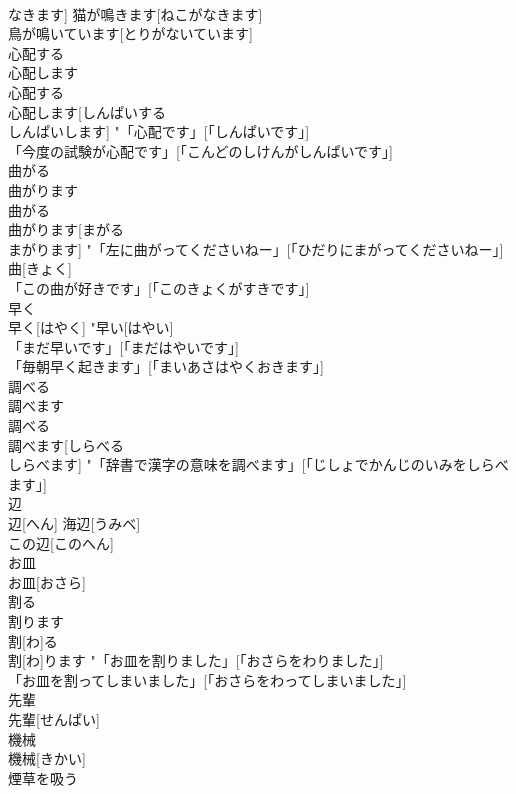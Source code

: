 \documentclass[8pt]{extreport}
\begin{document}
\begin{CJK}{UTF8}{min}
\\	なきます]	猫が鳴きます[ねこがなきます] 
\\	鳥が鳴いています[とりがないています] 
\\	心配する 
\\	心配します	
\\	心配する 
\\	心配します[しんぱいする 
\\	しんぱいします]	"「心配です」[「しんぱいです」] 
\\	「今度の試験が心配です」[「こんどのしけんがしんぱいです」] 
\\	曲がる 
\\	曲がります	
\\	曲がる 
\\	曲がります[まがる 
\\	まがります]	"「左に曲がってくださいねー」[「ひだりにまがってくださいねー」] 
\\	曲[きょく] 
\\	「この曲が好きです」[「このきょくがすきです」] 
\\	早く	
\\	早く[はやく]	"早い[はやい] 
\\	「まだ早いです」[「まだはやいです」] 
\\	「毎朝早く起きます」[「まいあさはやくおきます」] 
\\	調べる 
\\	調べます	
\\	調べる 
\\	調べます[しらべる 
\\	しらべます]	"「辞書で漢字の意味を調べます」[「じしょでかんじのいみをしらべます」] 
\\	辺	
\\	辺[へん]	海辺[うみべ] 
\\	この辺[このへん] 
\\	お皿	
\\	お皿[おさら]	
\\	割る 
\\	割ります	
\\	割[わ]る 
\\	割[わ]ります	"「お皿を割りました」[「おさらをわりました」] 
\\	「お皿を割ってしまいました」[「おさらをわってしまいました」] 
\\	先輩	
\\	先輩[せんぱい]	
\\	機械	
\\	機械[きかい]	
\\	煙草を吸う	

\end{CJK}
\end{document}
